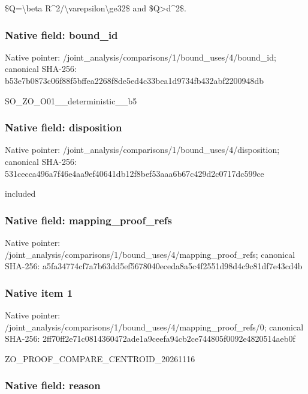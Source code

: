 \documentclass[10pt,a4paper]{article}
\begin{document}
\$Q=\textbackslash{}beta R\textasciicircum{}2/\textbackslash{}varepsilon\textbackslash{}ge32\$ and \$Q>d\textasciicircum{}2\$.


\subsubsection{Native field: bound\_id}


Native pointer: /joint\_analysis/comparis\allowbreak{}ons/1/bound\_uses/4/bound\allowbreak{}\_id; canonical SHA-256: b53e7b0873c06f88f5bffea2\allowbreak{}268f8de5ed4c33bea1d9734f\allowbreak{}b432abf2200948db


SO\_ZO\_O01\_\_deterministic\_\_b5


\subsubsection{Native field: disposition}


Native pointer: /joint\_analysis/comparis\allowbreak{}ons/1/bound\_uses/4/dispo\allowbreak{}sition; canonical SHA-256: 531cecca496a7f46e4aa9ef4\allowbreak{}0641db12f8bef53aaa6b67c4\allowbreak{}29d2c0717dc599ce


included


\subsubsection{Native field: mapping\_proof\_refs}


Native pointer: /joint\_analysis/comparis\allowbreak{}ons/1/bound\_uses/4/mappi\allowbreak{}ng\_proof\_refs; canonical SHA-256: a5fa34774cf7a7b63dd5ef56\allowbreak{}78040eceda8a5c4f2551d98d\allowbreak{}4c9c81df7e43cd4b



\subsubsection{Native item 1}


Native pointer: /joint\_analysis/comparis\allowbreak{}ons/1/bound\_uses/4/mappi\allowbreak{}ng\_proof\_refs/0; canonical SHA-256: 2ff70ff2e71c0814360472ad\allowbreak{}e1a9ceefa94cb2ce744805f0\allowbreak{}092e4820514aeb0f


ZO\_PROOF\_COMPARE\_CENTROID\_20261116


\subsubsection{Native field: reason}
\end{document}
